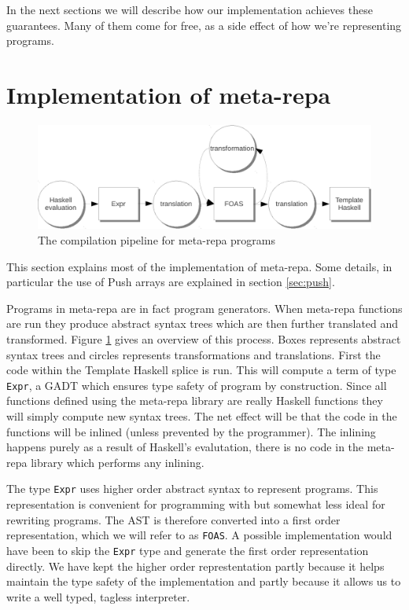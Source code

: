 \documentclass[preprint]{sigplanconf}
\begin{document}
In the next sections we will describe how our implementation achieves
these guarantees. Many of them come for free, as a side effect of how
we're representing programs.

\section{Implementation of meta-repa}

\label{sec:impl}

\begin{figure}[t]
\center
\includegraphics[scale=0.8]{meta.pdf}
\caption{The compilation pipeline for meta-repa programs}
\label{fig:pipeline}
\end{figure}

This section explains most of the implementation of meta-repa. Some
details, in particular the use of Push arrays are explained in section
\ref{sec:push}.

Programs in meta-repa are in fact program generators. When meta-repa
functions are run they produce abstract syntax trees which are then
further translated and transformed. Figure \ref{fig:pipeline} gives an
overview of this process. Boxes represents abstract syntax trees and
circles represents transformations and translations. First the code
within the Template Haskell splice is run. This will compute a term of
type \texttt{Expr}, a GADT which ensures type safety of program by
construction. Since all functions defined using the meta-repa library
are really Haskell functions they will simply compute new syntax trees.
The net effect will be that the code in the functions will be inlined
(unless prevented by the programmer). The inlining happens purely as a
result of Haskell's evalutation, there is no code in the meta-repa
library which performs any inlining.

The type \texttt{Expr} uses higher order abstract syntax to represent
programs. This representation is convenient for programming with but
somewhat less ideal for rewriting programs. The AST is therefore
converted into a first order representation, which we will refer to as
\texttt{FOAS}. A possible implementation would have been to skip the
\texttt{Expr} type and generate the first order representation directly.
We have kept the higher order represtentation partly because it helps
maintain the type safety of the implementation and partly because it
allows us to write a well typed, tagless interpreter.
\end{document}

